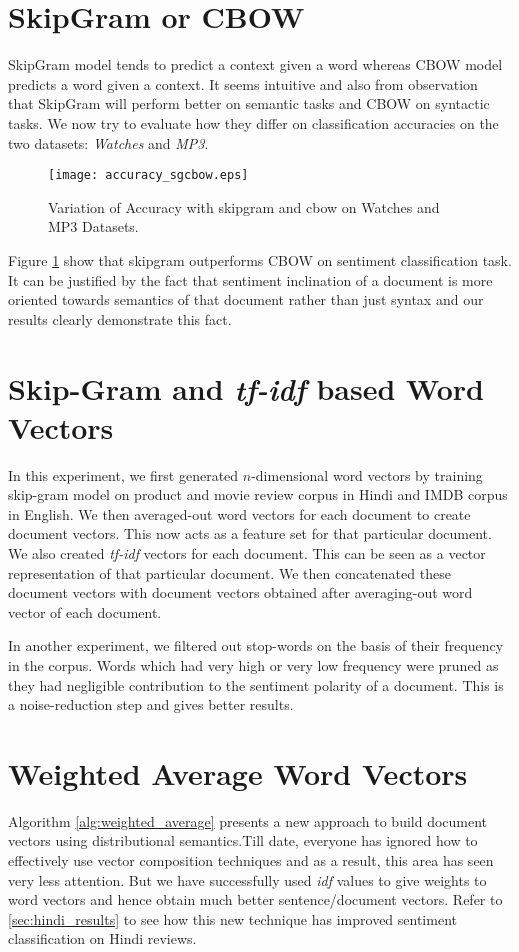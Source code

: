\section{SkipGram or CBOW}
SkipGram model tends to predict a context given a word whereas CBOW model predicts a word given a context. It seems intuitive and also from observation~\cite{Mikolov:13b} that SkipGram will perform better on semantic tasks and CBOW on syntactic tasks. We now try to evaluate how they differ on classification accuracies on the two datasets: \emph{Watches} and \emph{MP3}.
\begin{figure}[ht!]
\centering
\texttt{[image: accuracy\_sgcbow.eps]}
\caption{Variation of Accuracy with skipgram and cbow on Watches and MP3 Datasets. \label{fig:accuracy_sgcbow}}
\end{figure}
Figure \ref{fig:accuracy_sgcbow} show that skipgram outperforms CBOW on sentiment classification task. It can be justified by the fact that sentiment inclination of a document is more oriented towards semantics of that document rather than just syntax and our results clearly demonstrate this fact.

\section{Skip-Gram and \emph{tf-idf} based Word Vectors}
In this experiment, we first generated $n$-dimensional word vectors by training skip-gram model on product and movie review corpus in Hindi and IMDB corpus in English. We then averaged-out word vectors for each document to create document vectors. This now acts as a feature set for that particular document.
We also created \emph{tf-idf} vectors for each document. This can be seen as a vector representation of that particular document. We then concatenated these document vectors with document vectors obtained after averaging-out word vector of each document.

In another experiment, we filtered out stop-words on the basis of their frequency in the corpus. Words which had very high or very low frequency were pruned as they had negligible contribution to the sentiment polarity of a document. This is a noise-reduction step and gives better results.

\section{Weighted Average Word Vectors}
Algorithm \ref{alg:weighted_average} presents a new approach to build document vectors using distributional semantics.Till date, everyone has ignored how to effectively use vector composition techniques and as a result, this area has seen very less attention. But we have successfully used \emph{idf} values to give weights to word vectors and hence obtain much better sentence/document vectors. Refer to \ref{sec:hindi_results} to see how this new technique has improved sentiment classification on Hindi reviews.\\

